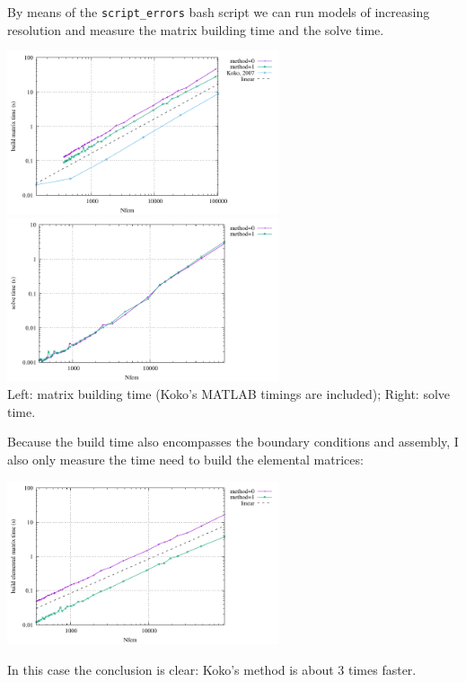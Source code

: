 
By means of the {\tt script\_errors} bash script we can run models 
of increasing resolution and measure the matrix building time and the 
solve time.
\begin{center}
\includegraphics[width=8cm]{python_codes/fieldstone_179/RESULTS/build.pdf}
\includegraphics[width=8cm]{python_codes/fieldstone_179/RESULTS/solve.pdf}\\
{\captionfont Left: matrix building time (Koko's MATLAB timings are included);
Right: solve time.}
\end{center}

Because the build time also encompasses the boundary conditions and 
assembly, I also only measure the time need to build the elemental 
matrices:
\begin{center}
\includegraphics[width=8cm]{python_codes/fieldstone_179/RESULTS/Ael.pdf}
\end{center}
In this case the conclusion is clear: Koko's method is about 3 times faster.


